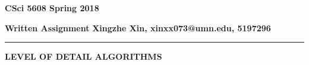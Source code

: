 \documentclass[12pt]{article}
\begin{document}
	\begin{center}
		{\Large \bf CSci 5608 Spring 2018}
	\end{center}
\medskip

{\bf Written Assignment}
\hfill
{\bf Xingzhe Xin, xinxx073@umn.edu, 5197296}
\hrule
\bigskip

\begin{center}
{\bfseries LEVEL OF DETAIL ALGORITHMS}\par
\end{center}
\end{document}
